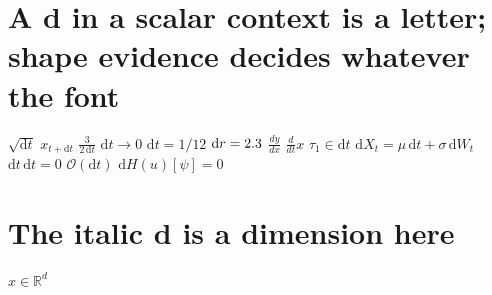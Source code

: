 \documentclass{article}
\begin{document}
\section{A d in a scalar context is a letter; shape evidence decides whatever the font}
$\sqrt{\mathrm{d}t}$ $x_{t+\mathrm{d}t}$ $\frac{3}{2\,\mathrm{d}t}$ $\mathrm{d}t\to 0$ $\mathrm{d}t=1/12$ ${\rm d}r=2.3$
$\frac{dy}{dx}$ $\frac{d}{dt}x$ $\tau_1\in\mathrm{d}t$ $\mathrm{d}X_t=\mu\,\mathrm{d}t+\sigma\,\mathrm{d}W_t$
$\mathrm{d}t\,\mathrm{d}t=0$ $\mathcal{O}(\mathrm{d}t)$ $\mathrm{d}H(u)[\psi]=0$

\section{The italic d is a dimension here}
$x\in\mathbb{R}^d$
\end{document}
